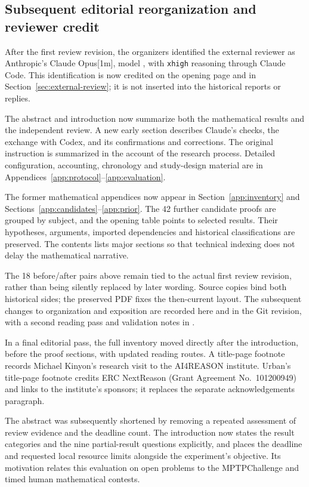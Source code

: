 \subsection{Subsequent editorial reorganization and reviewer credit}
After the first review revision, the organizers identified the external
reviewer as Anthropic's Claude Opus[1m], model
, with \texttt{xhigh} reasoning through Claude
Code. This identification is now credited on the opening page and in
Section~\ref{sec:external-review}; it is not inserted into the historical
reports or replies.

The abstract and introduction now summarize both the mathematical results
and the independent review. A new early section describes Claude's checks,
the exchange with Codex, and its confirmations and corrections. The
original instruction is summarized in the account of the research process.
Detailed configuration, accounting, chronology and study-design material
are in Appendices~\ref{app:protocol}--\ref{app:evaluation}.

The former mathematical appendices now appear in
Section~\ref{app:inventory} and
Sections~\ref{app:candidates}--\ref{app:prior}. The 42 further candidate
proofs are grouped by subject, and the opening table points to selected
results. Their hypotheses, arguments, imported dependencies and historical
classifications are preserved. The contents lists major sections so that
technical indexing does not delay the mathematical narrative.

The 18 before/after pairs above remain tied to the actual first review
revision, rather than being silently replaced by later wording.
Source copies bind both historical sides; the preserved PDF fixes the
then-current layout. The subsequent changes to organization and exposition
are recorded here and in the Git revision, with a second reading pass and
validation notes in .

In a final editorial pass, the full inventory moved directly after the
introduction, before the proof sections, with updated reading routes.
A title-page footnote records Michael Kinyon's research visit to the
AI4REASON institute. Urban's title-page footnote credits ERC NextReason
(Grant Agreement No.\ 101200949) and links to the institute's sponsors;
it replaces the separate acknowledgements paragraph.

The abstract was subsequently shortened by removing a repeated assessment
of review evidence and the deadline count. The introduction now states
the result categories and the nine partial-result questions explicitly,
and places the deadline and requested local resource limits alongside
the experiment's objective. Its motivation relates this evaluation on
open problems to the MPTPChallenge and timed human mathematical contests.


